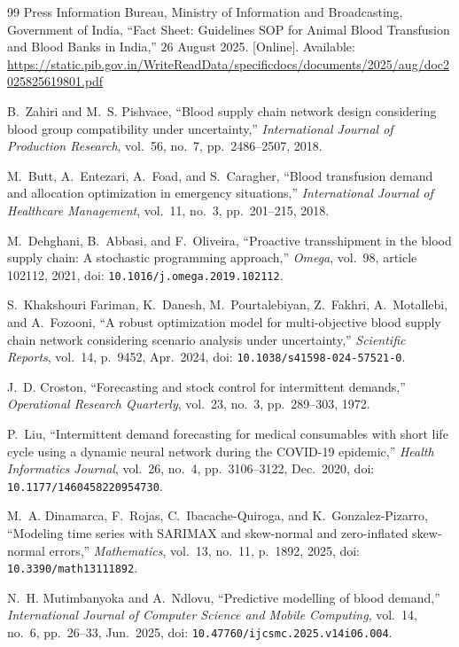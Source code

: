 \documentclass[12pt,a4paper]{article}
\begin{document}
\begin{thebibliography}{99}
Press Information Bureau, Ministry of Information and Broadcasting,
Government of India,
``Fact Sheet: Guidelines SOP for Animal Blood Transfusion and Blood
Banks in India,''
26 August 2025. [Online]. Available:
\url{https://static.pib.gov.in/WriteReadData/specificdocs/documents/2025/aug/doc2025825619801.pdf}

B.~Zahiri and M.~S. Pishvaee,
``Blood supply chain network design considering blood group compatibility
under uncertainty,''
\textit{International Journal of Production Research},
vol.~56, no.~7, pp.~2486--2507, 2018.

M.~Butt, A.~Entezari, A.~Foad, and S.~Caragher,
``Blood transfusion demand and allocation optimization in emergency
situations,''
\textit{International Journal of Healthcare Management},
vol.~11, no.~3, pp.~201--215, 2018.

M.~Dehghani, B.~Abbasi, and F.~Oliveira,
``Proactive transshipment in the blood supply chain: A stochastic
programming approach,''
\textit{Omega},
vol.~98, article 102112, 2021,
doi: \texttt{10.1016/j.omega.2019.102112}.

S.~Khakshouri Fariman, K.~Danesh, M.~Pourtalebiyan, Z.~Fakhri,
A.~Motallebi, and A.~Fozooni,
``A robust optimization model for multi-objective blood supply chain
network considering scenario analysis under uncertainty,''
\textit{Scientific Reports},
vol.~14, p.~9452, Apr.\ 2024,
doi: \texttt{10.1038/s41598-024-57521-0}.

J.~D. Croston,
``Forecasting and stock control for intermittent demands,''
\textit{Operational Research Quarterly},
vol.~23, no.~3, pp.~289--303, 1972.

P.~Liu,
``Intermittent demand forecasting for medical consumables with short life
cycle using a dynamic neural network during the COVID-19 epidemic,''
\textit{Health Informatics Journal},
vol.~26, no.~4, pp.~3106--3122, Dec.\ 2020,
doi: \texttt{10.1177/1460458220954730}.

M.~A. Dinamarca, F.~Rojas, C.~Ibacache-Quiroga, and K.~Gonzalez-Pizarro,
``Modeling time series with SARIMAX and skew-normal and zero-inflated
skew-normal errors,''
\textit{Mathematics},
vol.~13, no.~11, p.~1892, 2025,
doi: \texttt{10.3390/math13111892}.

N.~H. Mutimbanyoka and A.~Ndlovu,
``Predictive modelling of blood demand,''
\textit{International Journal of Computer Science and Mobile Computing},
vol.~14, no.~6, pp.~26--33, Jun.\ 2025,
doi: \texttt{10.47760/ijcsmc.2025.v14i06.004}.


\end{thebibliography}
\end{document}
